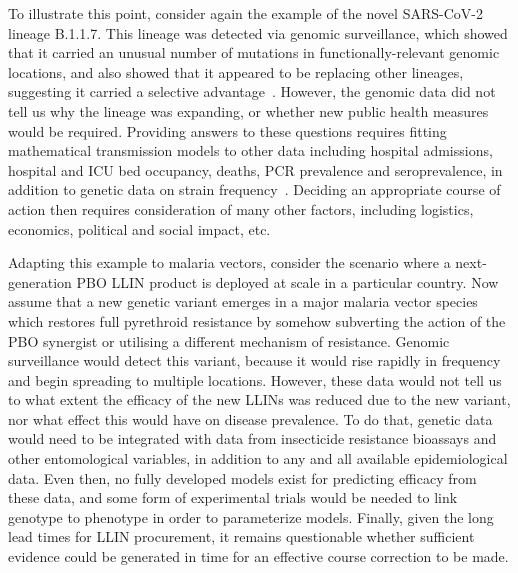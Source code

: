 \begin{refsection}
To illustrate this point, consider again the example of the novel SARS-CoV-2 lineage B.1.1.7.
%
This lineage was detected via genomic surveillance, which showed that it carried an unusual number of mutations in functionally-relevant genomic locations, and also showed that it appeared to be replacing other lineages, suggesting it carried a selective advantage~\parencite{Rambaut2020}.
%
However, the genomic data did not tell us why the lineage was expanding, or whether new public health measures would be required.
%
Providing answers to these questions requires fitting mathematical transmission models to other data including hospital admissions, hospital and ICU bed occupancy, deaths, PCR prevalence and seroprevalence, in addition to genetic data on strain frequency~\parencite{Davies2020}.
%
Deciding an appropriate course of action then requires consideration of many other factors, including logistics, economics, political and social impact, etc.


Adapting this example to malaria vectors, consider the scenario where a next-generation PBO LLIN product is deployed at scale in a particular country.
%
Now assume that a new genetic variant emerges in a major malaria vector species which restores full pyrethroid resistance by somehow subverting the action of the PBO synergist or utilising a different mechanism of resistance.
%
Genomic surveillance would detect this variant, because it would rise rapidly in frequency and begin spreading to multiple locations.
%
However, these data would not tell us to what extent the efficacy of the new LLINs was reduced due to the new variant, nor what effect this would have on disease prevalence.
%
To do that, genetic data would need to be integrated with data from insecticide resistance bioassays and other entomological variables, in addition to any and all available epidemiological data.
%
Even then, no fully developed models exist for predicting efficacy from these data, and some form of experimental trials would be needed to link genotype to phenotype in order to parameterize models.
%
Finally, given the long lead times for LLIN procurement, it remains questionable whether sufficient evidence could be generated in time for an effective course correction to be made.



\end{refsection}

